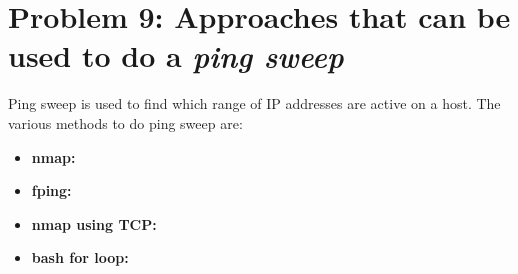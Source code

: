 \documentclass[]{report}
\begin{document}
\section{Problem 9: Approaches that can be used to do a \textit{ping sweep}}
Ping sweep is used to find which range of IP addresses are active on a host. The various methods to do ping sweep are:
\begin{itemize}
	\item \textbf{nmap:}
	\item \textbf{fping:}
	\item \textbf{nmap using TCP:}
	\item \textbf{bash for loop:}
\end{itemize}
\end{document}
